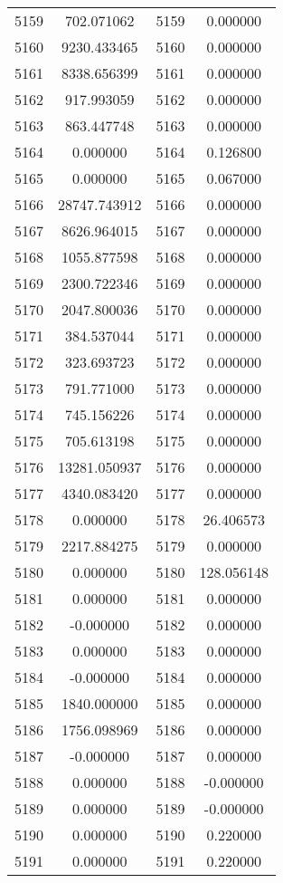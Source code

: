 \documentclass[12pt]{article}
\begin{document}
\begin{longtable}{@{}cccc@{}}
5159 & 702.071062 & 5159 & 0.000000 \\
5160 & 9230.433465 & 5160 & 0.000000 \\
5161 & 8338.656399 & 5161 & 0.000000 \\
5162 & 917.993059 & 5162 & 0.000000 \\
5163 & 863.447748 & 5163 & 0.000000 \\
5164 & 0.000000 & 5164 & 0.126800 \\
5165 & 0.000000 & 5165 & 0.067000 \\
5166 & 28747.743912 & 5166 & 0.000000 \\
5167 & 8626.964015 & 5167 & 0.000000 \\
5168 & 1055.877598 & 5168 & 0.000000 \\
5169 & 2300.722346 & 5169 & 0.000000 \\
5170 & 2047.800036 & 5170 & 0.000000 \\
5171 & 384.537044 & 5171 & 0.000000 \\
5172 & 323.693723 & 5172 & 0.000000 \\
5173 & 791.771000 & 5173 & 0.000000 \\
5174 & 745.156226 & 5174 & 0.000000 \\
5175 & 705.613198 & 5175 & 0.000000 \\
5176 & 13281.050937 & 5176 & 0.000000 \\
5177 & 4340.083420 & 5177 & 0.000000 \\
5178 & 0.000000 & 5178 & 26.406573 \\
5179 & 2217.884275 & 5179 & 0.000000 \\
5180 & 0.000000 & 5180 & 128.056148 \\
5181 & 0.000000 & 5181 & 0.000000 \\
5182 & -0.000000 & 5182 & 0.000000 \\
5183 & 0.000000 & 5183 & 0.000000 \\
5184 & -0.000000 & 5184 & 0.000000 \\
5185 & 1840.000000 & 5185 & 0.000000 \\
5186 & 1756.098969 & 5186 & 0.000000 \\
5187 & -0.000000 & 5187 & 0.000000 \\
5188 & 0.000000 & 5188 & -0.000000 \\
5189 & 0.000000 & 5189 & -0.000000 \\
5190 & 0.000000 & 5190 & 0.220000 \\
5191 & 0.000000 & 5191 & 0.220000 \\

\end{longtable}
\end{document}
